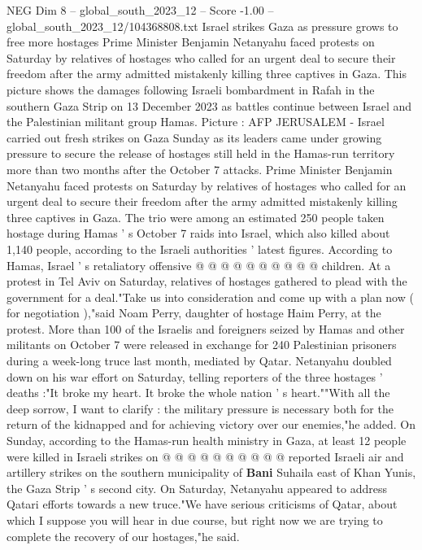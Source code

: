 \begin{textsample}{NEG Dim 8 – global\_south\_2023\_12 – Score -1.00 – global\_south\_2023\_12/104368808.txt}  \label{ex:f8_neg_223}
Israel strikes Gaza as pressure grows to free more hostages Prime Minister Benjamin Netanyahu faced protests on Saturday by relatives of hostages who called for an urgent deal to secure their freedom after the army admitted mistakenly killing three captives in Gaza.
This picture shows the damages following Israeli bombardment in Rafah in the southern Gaza Strip on 13 December 2023 as battles continue between Israel and the Palestinian militant group Hamas.
Picture : AFP JERUSALEM - Israel carried out fresh strikes on Gaza Sunday as its leaders came under growing pressure to secure the release of hostages still held in the Hamas-run territory more than two months after the October 7 attacks.
Prime Minister Benjamin Netanyahu faced protests on Saturday by relatives of hostages who called for an urgent deal to secure their freedom after the army admitted mistakenly killing three captives in Gaza.
The trio were among an estimated 250 people taken hostage during Hamas ' s October 7 raids into Israel, which also killed about 1,140 people, according to the Israeli authorities ' latest figures.
According to Hamas, Israel ' s retaliatory offensive @ @ @ @ @ @ @ @ @ @ children.
At a protest in Tel Aviv on Saturday, relatives of hostages gathered to plead with the government for a deal."Take us into consideration and come up with a plan now ( for negotiation ),"said Noam Perry, daughter of hostage Haim Perry, at the protest.
More than 100 of the Israelis and foreigners seized by Hamas and other militants on October 7 were released in exchange for 240 Palestinian prisoners during a week-long truce last month, mediated by Qatar.
Netanyahu doubled down on his war effort on Saturday, telling reporters of the three hostages ' deaths :"It broke my heart.
It broke the whole nation ' s heart.""With all the deep sorrow, I want to clarify : the military pressure is necessary both for the return of the kidnapped and for achieving victory over our enemies,"he added.
On Sunday, according to the Hamas-run health ministry in Gaza, at least 12 people were killed in Israeli strikes on @ @ @ @ @ @ @ @ @ @ reported Israeli air and artillery strikes on the southern municipality of \textbf{Bani} Suhaila east of Khan Yunis, the Gaza Strip ' s second city.
On Saturday, Netanyahu appeared to address Qatari efforts towards a new truce."We have serious criticisms of Qatar, about which I suppose you will hear in due course, but right now we are trying to complete the recovery of our hostages,"he said.

\end{textsample}
